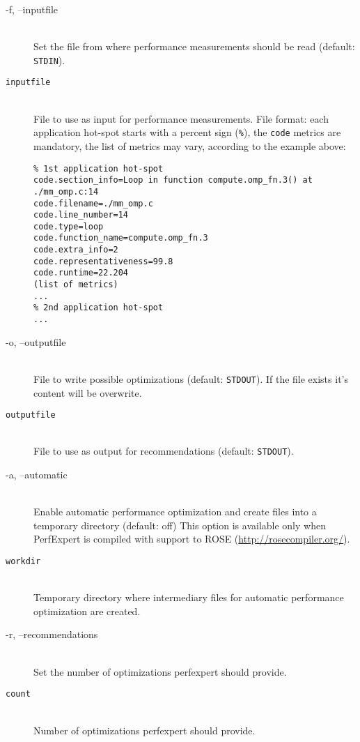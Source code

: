 \begin{description}
	\item[\btt -f, --inputfile]\hfill \\
	Set the file from where performance measurements should be read (default: \texttt{STDIN}).

	\item[\tt inputfile]\hfill \\
	File to use as input for performance measurements. File format: each application hot-spot starts with a percent sign (\texttt{\%}), the \texttt{code} metrics are mandatory, the list of metrics may vary, according to the example above:
	\begin{verbatim}
% 1st application hot-spot
code.section_info=Loop in function compute.omp_fn.3() at ./mm_omp.c:14
code.filename=./mm_omp.c
code.line_number=14
code.type=loop
code.function_name=compute.omp_fn.3
code.extra_info=2
code.representativeness=99.8
code.runtime=22.204
(list of metrics)
...
% 2nd application hot-spot
...
	\end{verbatim}
	\item[\btt -o, --outputfile]\hfill \\
	File to write possible optimizations (default: \texttt{STDOUT}). If the file exists it's content will be overwrite.

	\item[\tt outputfile]\hfill \\
	File to use as output for recommendations (default: \texttt{STDOUT}).

	\item[\btt -a, --automatic]\hfill \\
	Enable automatic performance optimization and create files into a temporary directory (default: off) This option is available only when PerfExpert is compiled with support to ROSE (\url{http://rosecompiler.org/}).

	\item[\tt workdir]\hfill \\
	Temporary directory where intermediary files for automatic performance optimization are created.

	\item[\btt -r, --recommendations]\hfill \\
	Set the number of optimizations perfexpert should provide.

	\item[\tt count]\hfill \\
	Number of optimizations perfexpert should provide.


\end{description}

